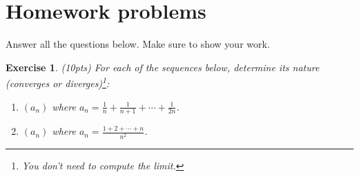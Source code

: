 \documentclass[12pt]{article}
\theoremstyle{plain}
\newtheorem{exer}{\textbf{Exercise}}}
\theoremstyle{plain}
\theoremstyle{plain}
\theoremstyle{plain}
\begin{document}
\section{Homework problems}
Answer all the questions below. Make sure to show your work.

\begin{exer}
(10pts)
For each of the sequences below, determine its nature (converges or diverges)\footnote{You don't need to compute the limit.}:
	\begin{enumerate}[label=\textbf{\alph*)}]
	\item $(a_n)$ where $a_n = \frac{1}{n} + \frac{1}{n + 1} + \cdots + \frac{1}{2n}$.
	\item $(a_n)$ where $a_n = \frac{1 + 2 + \cdots + n}{n^2}$.
	\end{enumerate}
\end{exer}
\end{document}
